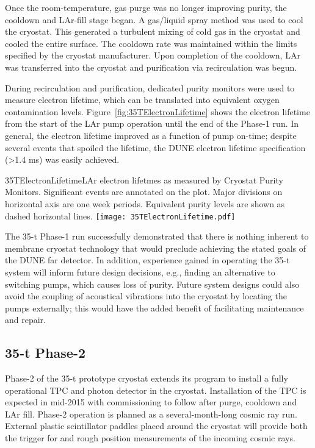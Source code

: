 Once the room-temperature, gas purge was no longer improving purity,
the cooldown and LAr-fill stage began.
A gas/liquid spray method was used to cool the cryostat.
This generated a turbulent mixing of cold gas in the cryostat and cooled the entire surface.
The cooldown rate was maintained within the limits %
specified by the cryostat manufacturer.
Upon completion of the cooldown, LAr was transferred into the cryostat and %
purification via recirculation was begun. 

During recirculation and purification, dedicated purity monitors were used to measure electron lifetime, which can
be translated into equivalent oxygen contamination levels.
Figure~\ref{fig:35TElectronLifetime} shows the electron lifetime from the start of the
LAr pump operation until the end of the Phase-1 run.
In general, the electron lifetime improved as a function of pump
on-time; despite %
several events that spoiled the lifetime, %
the DUNE electron lifetime
specification (>1.4 ms) was easily achieved.

\begin{cdrfigure}{35TElectronLifetime}{LAr electron lifetmes as measured by
Cryostat Purity Monitors. Significant events are annotated on the plot. Major divisions on horizontal axis
are one week periods. Equivalent purity levels are shown as dashed horizontal lines.}
\texttt{[image: 35TElectronLifetime.pdf]}
\end{cdrfigure}

The 35-t Phase-1 run successfully demonstrated that there is nothing %
inherent to
membrane cryostat technology that would preclude achieving the stated goals of the
DUNE far detector. In addition, experience gained in operating the 35-t system
will inform future design decisions, e.g., finding an alternative to switching pumps, which
causes loss of purity.  %
Future system
designs could also avoid the coupling of acoustical vibrations into the cryostat by %
locating the pumps externally; this would have the added benefit of facilitating
maintenance and repair. 

\subsection{35-t Phase-2}
Phase-2 of the 35-t prototype cryostat extends its program %
to install %
a fully operational TPC and
photon detector in the %
cryostat.
Installation of the TPC is expected in mid-2015 with commissioning to follow
after purge, cooldown and LAr fill.  Phase-2 operation is planned as a several-month-long
cosmic ray run.  External plastic scintillator paddles placed around the cryostat will provide
both the trigger for and rough position measurements of the incoming cosmic rays.

